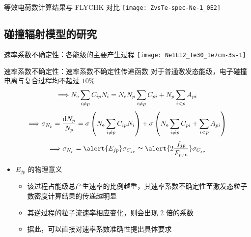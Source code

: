 \begin{frame}{等效电荷数计算结果与 FLYCHK 对比}
	\centering
	\texttt{[image: ZvsTe-spec-Ne-1\_0E2]}
\end{frame}

\subsection{碰撞辐射模型的研究}

\begin{frame}{速率系数不确定性：各能级的主要产生过程}
	\centering
	\texttt{[image: Ne1E12\_Te30\_1e7cm-3s-1]}
\end{frame}

\begin{frame}{速率系数不确定性：速率系数不确定性传递函数}
	\centering
	对于普通激发态能级，电子碰撞电离与复合过程均不超过 $10\%$
	$$\Longrightarrow N_{\rm e}\sum_{i\ne p}C_{ip}N_i=N_{\rm e}N_p\sum_{i\ne p}C_{pi}+N_p\sum_{i<p}A_{pi}$$
	$$\Longrightarrow \sigma_{N_p}=\frac{{\rm d}N_p}{N_p} = \sigma\left(N_{\rm e}\sum_{i\ne p}C_{ip}N_i\right) + \sigma\left(N_{\rm e}\sum_{i\ne p}C_{pi}+\sum_{i<p}A_{pi}\right)$$
	$$\Longrightarrow \sigma_{N_p}=\alert{E_{jp}}\sigma_{C_{jp}}\simeq\alert{2\frac{f_{jp}}{F_{p,{\rm in}}}}\sigma_{C_{jp}}$$
	\begin{itemize}
		\item $E_{jp}$ 的物理意义
			\begin{itemize}
				\item 该过程占能级总产生速率的比例越重，其速率系数不确定性至激发态粒子数密度计算结果的传递越明显
				\item 其逆过程的粒子流速率相应变化，则会出现 2 倍的系数
				\item 据此，可以\alert{直接}对速率系数准确性提出具体要求
			\end{itemize}
	\end{itemize}
\end{frame}

